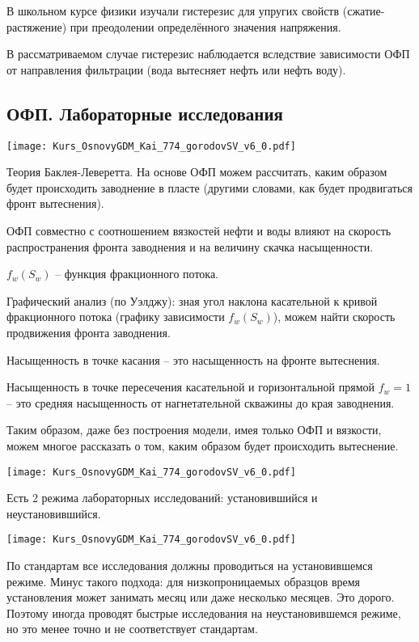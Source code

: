 \documentclass[main.tex]{subfiles}
\begin{document}
В школьном курсе физики изучали гистерезис для упругих свойств (сжатие-растяжение) при преодолении определённого значения напряжения.

В рассматриваемом случае гистерезис наблюдается вследствие зависимости ОФП от направления фильтрации (вода вытесняет нефть или нефть воду).

\subsection{ОФП. Лабораторные исследования}

\texttt{[image: Kurs\_OsnovyGDM\_Kai\_774\_gorodovSV\_v6\_0.pdf]}

Теория Баклея-Леверетта.
На основе ОФП можем рассчитать, каким образом будет происходить заводнение в пласте  (другими словами, как будет продвигаться фронт вытеснения).

ОФП совместно с соотношением вязкостей нефти и воды влияют на скорость распространения фронта заводнения и на величину скачка насыщенности.

$f_w(S_w)$ -- функция фракционного потока.

Графический анализ (по Уэлджу): зная угол наклона касательной к кривой фракционного потока (графику зависимости $f_w(S_w)$), можем найти скорость продвижения фронта заводнения.

Насыщенность в точке касания -- это насыщенность на фронте вытеснения.

Насыщенность в точке пересечения касательной и горизонтальной прямой $f_w=1$ -- это средняя насыщенность от нагнетательной скважины до края заводнения.

Таким образом, даже без построения модели, имея только ОФП и вязкости, можем многое рассказать о том, каким образом будет происходить вытеснение.

\texttt{[image: Kurs\_OsnovyGDM\_Kai\_774\_gorodovSV\_v6\_0.pdf]}

Есть 2 режима лабораторных исследований: установившийся и неустановившийся.

\texttt{[image: Kurs\_OsnovyGDM\_Kai\_774\_gorodovSV\_v6\_0.pdf]}

По стандартам все исследования должны проводиться на установившемся режиме.
Минус такого подхода: для низкопроницаемых образцов время установления может занимать месяц или даже несколько месяцев.
Это дорого.
Поэтому иногда проводят быстрые исследования на неустановившемся режиме, но это менее точно и не соответствует стандартам.
\end{document}
